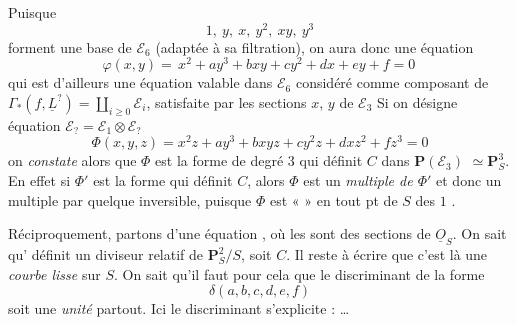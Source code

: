 \documentclass[11pt,a4paper]{article}
\begin{document}
 
Puisque %
\[
1,\ y,\ x,\ y^2,\ xy,\ y^3
\]
forment une base de $\mathcal{E}_6$ (adaptée à sa filtration), on aura
donc une équation
\[
\varphi(x,y) = \boxed{\,x^2 + a y^3 + b xy + c y^2 + d x + e y + f = 0\,}
\]
qui est d'ailleurs une équation valable dans $\mathcal{E}_6$ considéré comme
composant de $\Gamma_*(f,\underline{L}^{?}) = \coprod_{i\geqslant 0}\mathcal{E}_i$,
satisfaite par les sections $x$, $y$ de $\mathcal{E}_3$
 
 Si on désigne \ill{}  \struck{\ill{}} 
équation  \ill{} \ill{}
$\mathcal{E}_{?}=\mathcal{E}_1\otimes\mathcal{E}_{?}$ \ill{} \ill{}
\[
\Phi(x,y,z) = x^2 z + a y^3 + b xyz + c y^2 z + d x z^2 + f z^3 = 0
\]
on \emph{constate} alors que $\Phi$ est la forme de degré $3$ qui définit
\struck{\ill{}} $C$ dans $\mathbf{P}(\mathcal{E}_3)$
$\simeq\mathbf{P}^{3}_S$. En effet si $\Phi'$ est la forme qui
définit $C$, alors $\Phi$ est un \emph{multiple de $\Phi'$} et
\struck{\ill{} \ill{}} donc un multiple par quelque  inversible,
puisque $\Phi$ est «  » en tout pt de $S$ \ill{} \ill{}
 des $1$ \ill{}.

Réciproquement, partons d'une équation , où les 
\struck{\ill{}} sont des sections de $\underline{O}_S$. On sait qu' \struck{\ill{}} définit un diviseur relatif  de
$\mathbf{P}^2_S/S$, soit $C$. Il reste à écrire que c'est là une \emph{courbe
lisse} sur $S$. On sait qu'il faut pour cela que le discriminant de la forme
\[
\delta(a,b,c,d,e,f)
\]
soit une \emph{unité} partout. Ici le discriminant s'explicite : \ldots
\end{document}
